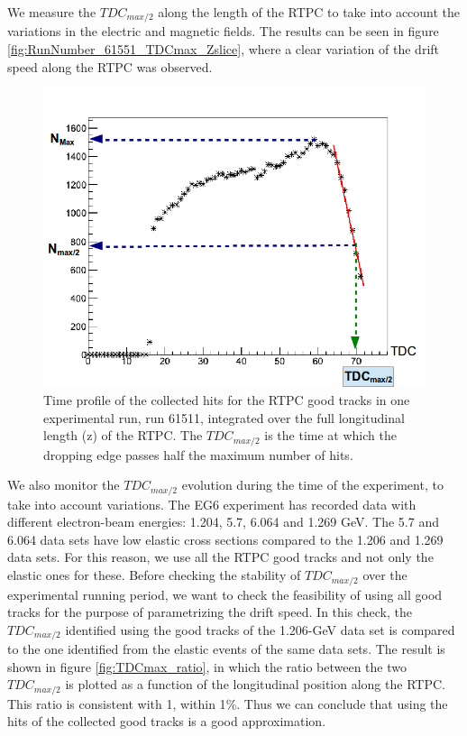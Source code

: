We measure the $TDC_{max/2}$ along the length of the RTPC to take into account 
the variations in the electric and magnetic fields. The results can be seen in 
figure \ref{fig:RunNumber_61551_TDCmax_Zslice}, where a clear variation of the 
drift speed along the RTPC was observed. \\ \begin{figure}[tbp]
\centering
\vspace{-0.1in}
\includegraphics[scale=0.35]{fig_rtpc/TDC_profile.png}
\caption{Time profile of the collected hits for the RTPC good tracks in one 
   experimental run, run 61511, integrated over the full longitudinal length 
(z) of the RTPC. The $TDC_{max/2}$ is the time at which the dropping edge 
passes half the maximum number of hits.}
\label{fig:TDC_profile}
\end{figure} 

We also monitor the $TDC_{max/2}$ evolution during the time of the experiment, 
to take into account variations. The EG6 experiment has recorded data with 
different electron-beam energies: 1.204, 5.7, 6.064 and 1.269 GeV. The 5.7 and 
6.064 data sets have low elastic cross sections compared to the 1.206 and 1.269 
data sets. For this reason, we use all the RTPC good tracks and not only the 
elastic ones for these. Before checking the stability of $TDC_{max/2}$ over the 
experimental running period, we want to check the feasibility of using all good 
tracks for the purpose of parametrizing the drift speed. In this check, the 
$TDC_{max/2}$ identified using the good tracks of the 1.206-GeV data set is 
compared to the one identified from the elastic events of the same data sets.  
The result is shown in figure \ref{fig:TDCmax_ratio}, in which the ratio 
between the two $TDC_{max/2}$ is plotted as a function of the longitudinal 
position along the RTPC. This ratio is consistent with 1, within 1$\%$. Thus we 
can conclude that using the hits of the collected good tracks is a good 
approximation. \\

